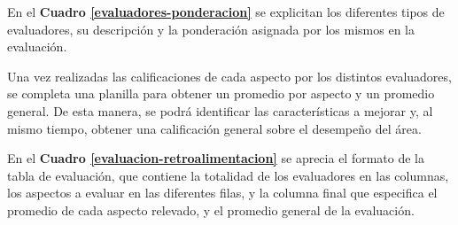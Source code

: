 En el \textbf{Cuadro \ref{evaluadores-ponderacion}} se explicitan los diferentes tipos de evaluadores, su descripción y la ponderación asignada por los mismos en la evaluación.

\begin{table}[h]
    \centering
    \caption{Descripción y ponderación de los diferentes evaluadores.}
    \label{evaluadores-ponderacion}
\end{table}

Una vez realizadas las calificaciones de cada aspecto por los distintos evaluadores, se completa una planilla para obtener un promedio por aspecto y un promedio general.
De esta manera, se podrá identificar las características a mejorar y, al mismo tiempo, obtener una calificación general sobre el desempeño del área.

En el \textbf{Cuadro \ref{evaluacion-retroalimentacion}} se aprecia el formato de la tabla de evaluación, que contiene la totalidad de los evaluadores en las columnas, los aspectos a evaluar en las diferentes filas, y la columna final que especifica el promedio de cada aspecto relevado, y el promedio general de la evaluación.  

